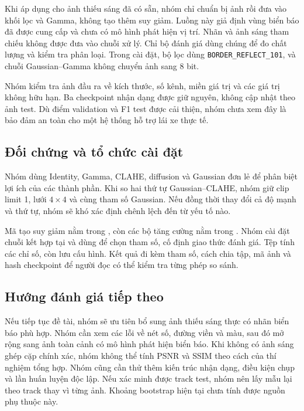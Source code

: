 Khi áp dụng cho ảnh thiếu sáng đã có sẵn, nhóm chỉ chuẩn bị ảnh rồi đưa vào khối lọc và Gamma, không tạo thêm suy giảm. Luồng này giả định vùng biển báo đã được cung cấp và chưa có mô hình phát hiện vị trí. Nhãn và ảnh sáng tham chiếu không được đưa vào chuỗi xử lý. Chỉ bộ đánh giá dùng chúng để đo chất lượng và kiểm tra phân loại. Trong cài đặt, bộ lọc dùng \texttt{BORDER\_REFLECT\_101}, và chuỗi Gaussian--Gamma không chuyển ảnh sang 8 bit.

Nhóm kiểm tra ảnh đầu ra về kích thước, số kênh, miền giá trị và các giá trị không hữu hạn. Ba checkpoint nhận dạng được giữ nguyên, không cập nhật theo ảnh test. Dù điểm validation và F1 test được cải thiện, nhóm chưa xem đây là bảo đảm an toàn cho một hệ thống hỗ trợ lái xe thực tế.

\subsection{Đối chứng và tổ chức cài đặt}
Nhóm dùng Identity, Gamma, CLAHE, diffusion và Gaussian đơn lẻ để phân biệt lợi ích của các thành phần. Khi so hai thứ tự Gaussian--CLAHE, nhóm giữ clip limit 1, lưới $4\times4$ và cùng tham số Gaussian. Nếu đồng thời thay đổi cả độ mạnh và thứ tự, nhóm sẽ khó xác định chênh lệch đến từ yếu tố nào.

Mã tạo suy giảm nằm trong , còn các bộ tăng cường nằm trong . Nhóm cài đặt chuỗi kết hợp tại  và dùng  để chọn tham số, cố định giao thức đánh giá. Tệp  tính các chỉ số, còn  lưu cấu hình. Kết quả đi kèm tham số, cách chia tập, mã ảnh và hash checkpoint để người đọc có thể kiểm tra từng phép so sánh.

\subsection{Hướng đánh giá tiếp theo}
Nếu tiếp tục đề tài, nhóm sẽ ưu tiên bổ sung ảnh thiếu sáng thực có nhãn biển báo phù hợp. Nhóm cần xem các lỗi về nét số, đường viền và màu, sau đó mở rộng sang ảnh toàn cảnh có mô hình phát hiện biển báo. Khi không có ảnh sáng ghép cặp chính xác, nhóm không thể tính PSNR và SSIM theo cách của thí nghiệm tổng hợp. Nhóm cũng cần thử thêm kiến trúc nhận dạng, điều kiện chụp và lần huấn luyện độc lập. Nếu xác minh được track test, nhóm nên lấy mẫu lại theo track thay vì từng ảnh. Khoảng bootstrap hiện tại chưa tính được nguồn phụ thuộc này.
